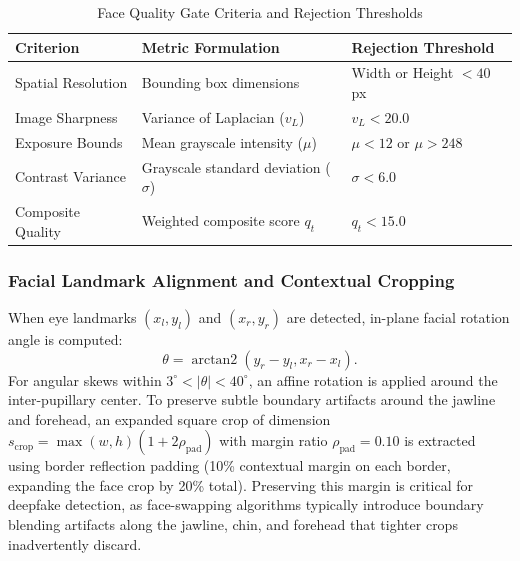 \documentclass[conference]{IEEEtran}
\begin{document}
\begin{table}[htbp]
\caption{Face Quality Gate Criteria and Rejection Thresholds}
\label{tab:quality}
\centering
\setlength{\tabcolsep}{3pt}
\scriptsize
\begin{tabular}{|l|l|l|}
\hline
\textbf{Criterion} & \textbf{Metric Formulation} & \textbf{Rejection Threshold} \\
\hline
Spatial Resolution & Bounding box dimensions & Width or Height $< 40$ px \\
Image Sharpness & Variance of Laplacian ($v_L$) & $v_L < 20.0$ \\
Exposure Bounds & Mean grayscale intensity ($\mu$) & $\mu < 12$ or $\mu > 248$ \\
Contrast Variance & Grayscale standard deviation ($\sigma$) & $\sigma < 6.0$ \\
Composite Quality & Weighted composite score $q_t$ & $q_t < 15.0$ \\
\hline
\end{tabular}
\end{table}

\subsubsection{Facial Landmark Alignment and Contextual Cropping}
When eye landmarks $(x_l, y_l)$ and $(x_r, y_r)$ are detected, in-plane facial rotation angle is computed:
\begin{equation}
\theta = \operatorname{arctan2}(y_r - y_l, x_r - x_l).
\label{eq:tilt}
\end{equation}
For angular skews within $3^\circ < \vert{}\theta\vert{} < 40^\circ$, an affine rotation is applied around the inter-pupillary center. To preserve subtle boundary artifacts around the jawline and forehead, an expanded square crop of dimension $s_{\text{crop}} = \max(w, h)(1 + 2\rho_{\text{pad}})$ with margin ratio $\rho_{\text{pad}} = 0.10$ is extracted using border reflection padding (10\% contextual margin on each border, expanding the face crop by 20\% total). Preserving this margin is critical for deepfake detection, as face-swapping algorithms typically introduce boundary blending artifacts along the jawline, chin, and forehead that tighter crops inadvertently discard.
\end{document}
